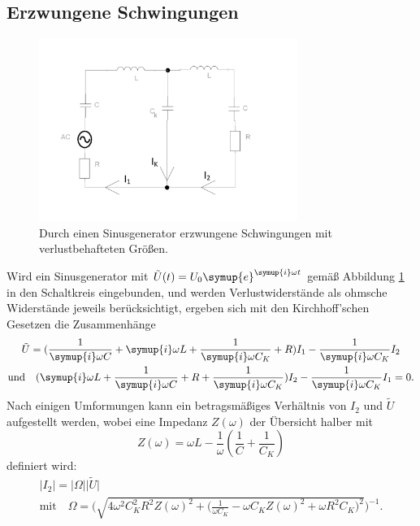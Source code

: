 \subsection{Erzwungene Schwingungen}
\label{subsec:erzwungen}
\FloatBarrier
\begin{figure}
    \centering
    \includegraphics[width=0.75\textwidth]{plots/gekop_schw_kreis1.pdf}
    \caption{Durch einen Sinusgenerator erzwungene Schwingungen mit verlustbehafteten Größen.}
    \label{fig:gezwung-sinus}
\end{figure}
Wird ein Sinusgenerator mit ${\tilde{U}(t)=U_0 \symup{e}^{\symup{i}\omega t}}$ gemäß Abbildung \ref{fig:gezwung-sinus} in den Schaltkreis 
eingebunden, und werden Verlustwiderstände als ohmsche Widerstände jeweils berücksichtigt, ergeben sich mit den Kirchhoff'schen 
Gesetzen die Zusammenhänge 
\begin{gather}
    \tilde{U}=(\frac{1}{\symup{i}\omega C} +  \symup{i} \omega L + \frac{1}{\symup{i}\omega C_K} + R)I_1 - \frac{1}{\symup{i}\omega C_K} I_2 \\
    \text{und} \quad (\symup{i}\omega L + \frac{1}{\symup{i}\omega C} + R+ \frac{1}{\symup{i}\omega C_K}) I_2 - \frac{1}{\symup{i}\omega C_K}I_1 =0 \text{.}
\end{gather}
Nach einigen Umformungen kann ein betragsmäßiges Verhältnis von $I_2$ und $\tilde{U}$ aufgestellt werden, wobei eine Impedanz ${Z(\omega)}$ 
der Übersicht halber mit 
\begin{equation*}
    Z(\omega) = \omega L - \frac{1}{\omega} (\frac{1}{C} + \frac{1}{C_K})    
\end{equation*}
definiert wird:
\begin{gather}
    \lvert I_2 \rvert = \lvert \Omega \rvert \lvert \tilde{U} \rvert \\ 
    \text{mit} \quad \Omega = \Biggl(\sqrt{4 \omega ^2 C_K^2 R^2 Z(\omega)^2 + \bigl(\frac{1}{\omega C_K} - \omega C_K Z(\omega)^2 + \omega R^2 C_K\bigr)^2 }\Biggr)^{-1} .
\end{gather}
